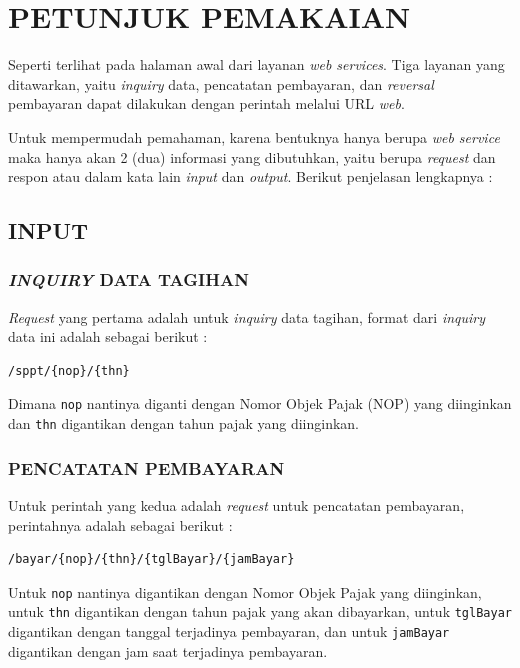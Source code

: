 \documentclass[pdftex,12pt, oneside]{article}
\begin{document}
\section{PETUNJUK PEMAKAIAN}

Seperti terlihat pada halaman awal dari layanan \textit{web services}. Tiga layanan yang ditawarkan, yaitu \textit{inquiry} data, pencatatan pembayaran, dan \textit{reversal} pembayaran dapat dilakukan dengan perintah melalui URL \textit{web}.

Untuk mempermudah pemahaman, karena bentuknya hanya berupa \textit{web service} maka hanya akan 2 (dua) informasi yang dibutuhkan, yaitu berupa \textit{request} dan respon atau dalam kata lain \textit{input} dan \textit{output}. Berikut penjelasan lengkapnya :

\subsection{INPUT}

\subsubsection{\textit{INQUIRY} DATA TAGIHAN}

\textit{Request} yang pertama adalah untuk \textit{inquiry} data tagihan, format dari \textit{inquiry} data ini adalah sebagai berikut :

\begin{lstlisting}
/sppt/{nop}/{thn}
\end{lstlisting}

Dimana \texttt{nop} nantinya diganti dengan Nomor Objek Pajak (NOP) yang diinginkan dan \texttt{thn} digantikan dengan tahun pajak yang diinginkan.

\subsubsection{PENCATATAN PEMBAYARAN}

Untuk perintah yang kedua adalah \textit{request} untuk pencatatan pembayaran, perintahnya adalah sebagai berikut :

\begin{lstlisting}
/bayar/{nop}/{thn}/{tglBayar}/{jamBayar}
\end{lstlisting}

Untuk \texttt{nop} nantinya digantikan dengan Nomor Objek Pajak yang diinginkan, untuk \texttt{thn} digantikan dengan tahun pajak yang akan dibayarkan, untuk \texttt{tglBayar} digantikan dengan tanggal terjadinya pembayaran, dan untuk \texttt{jamBayar} digantikan dengan jam saat terjadinya pembayaran.
\end{document}

